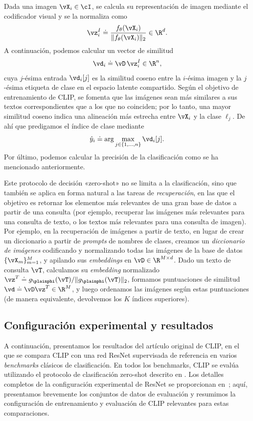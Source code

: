 \documentclass[../../book-main_es.tex]{subfiles}
\begin{document}
Dada una imagen \(\vX_i \in \cI\), se calcula su representación de imagen mediante el codificador visual y se la normaliza como
\[
\vz_i^I \doteq \frac{f_{\theta}(\vX_i)}{\|f_{\theta}(\vX_i)\|_2} \in \R^{d}.
\]
A continuación, podemos calcular un vector de similitud
\[
\vd_i \doteq \vD\,\vz_i^I \in \R^{n},
\]
cuya \(j\)-ésima entrada \(\vd_i[j]\) es la similitud coseno entre la \(i\)-ésima imagen y la \(j\)-ésima etiqueta de clase
en el espacio latente compartido. Según el objetivo de entrenamiento de CLIP, se fomenta que las imágenes sean más similares a sus
textos correspondientes que a los que no coinciden; por lo tanto, una mayor similitud coseno indica una alineación más estrecha entre
\(\vX_i\) y la clase \(\ell_j\). De ahí que predigamos el índice de clase mediante
\[
\hat{y}_i \doteq \arg\max_{j \in \{1,\ldots,n\}} \vd_i[j].
\]
Por último, podemos calcular la precisión de la clasificación como se ha mencionado anteriormente.

Este protocolo de decisión «zero-shot» no se limita a la clasificación, sino que también se aplica en forma natural a las tareas de \emph{recuperación},
en las que el objetivo es retornar los elementos más relevantes de una gran base de datos a partir de una consulta (por ejemplo, recuperar las imágenes más
relevantes para una consulta de texto, o los textos más relevantes para una consulta de imagen). Por ejemplo, en la recuperación de imágenes a partir de texto,
en lugar de crear un diccionario a partir de \textit{prompts} de nombres de clases, creamos un \emph{diccionario de imágenes} codificando
y normalizando todas las imágenes de la base de datos \(\{\vX_m\}_{m=1}^{M}\), y apilando sus \textit{embeddings} en
\(\vD\in\R^{M\times d}\). Dado un texto de consulta \(\vT\), calculamos su \textit{embedding} normalizado
\(\vz^T \doteq g_{\plainphi}(\vT)/\|g_{\plainphi}(\vT)\|_2\), formamos puntuaciones de similitud
\(\vd \doteq \vD\vz^T\in\R^{M}\), y luego ordenamos las imágenes según estas puntuaciones (de manera equivalente, devolvemos los \(K\)
índices superiores).

\subsection{Configuración experimental y resultados}

A continuación, presentamos los resultados del artículo original de CLIP, en el que se compara 
CLIP con una red ResNet supervisada de referencia en varios \textit{benchmarks} clásicos de 
clasificación. En todos los benchmarks, CLIP se evalúa utilizando el protocolo de clasificación 
zero-shot descrito en . Los detalles completos de la configuración experimental 
de ResNet se proporcionan en~\citep{He2016-lc}; aquí, presentamos brevemente los conjuntos de datos 
de evaluación y resumimos la configuración de entrenamiento y evaluación de CLIP relevantes para estas comparaciones.
\end{document}
